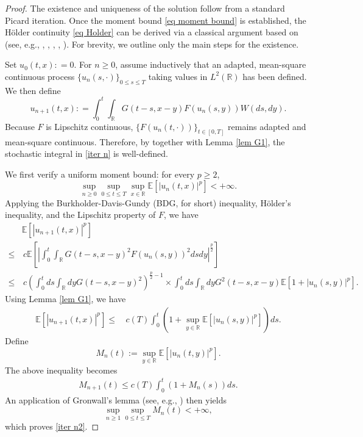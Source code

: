 \documentclass[11pt,reqno]{amsart}
\numberwithin{equation}{section}
\def\R{\mathbb{R}}
\newcommand{\1}{{\bf 1}}
\newcommand{\2}{{\bf 2}}
\begin{document}
 \begin{proof}  The existence and uniqueness of the solution follow from a standard Picard iteration. Once the moment bound \eqref{eq moment bound} is established,   the H\"older continuity  \eqref{eq Holder} can be derived via a  classical argument based on  \cite[Lemmas 2.2, 2.3, 2.4]{CL25} (see, e.g., \cite[Section 5]{D99}, \cite[Theorem 9]{DM03}, \cite[pp. 59--61]{DKMNX09},  \cite[Lemma 4.2.4]{DS26}, \cite{KS23}).     For  brevity, we  outline  only  the main  steps for  the existence.
      
Set  $u_0 (t, x): = 0$. For $n\ge0$,  assume inductively  that    an adapted, mean-square continuous process
  $\{u_n(s, \cdot)\}_{0\le s\le T}$ taking   values in $L^2(\mathbb R)$ has been defined.  We then define   
\begin{equation}\label{iter n}
u_{n+1} (t, x): =   \int_0^t \int_\R G(t-s, x-y) F(u_{n}(s,y)) W(ds, dy). 
\end{equation}
Because $F$  is   Lipschitz continuous,  $\{F(u_{n}(t,\cdot))\}_{t\in [0,T]} $ remains  adapted and mean-square continuous.  Therefore,   by   \cite[Lemma  6 and Theorem 6]{DM03}   together  with  Lemma \ref{lem G1}, the stochastic integral in \eqref{iter n} is well-defined.

 We first verify a uniform moment bound:  for every  $p\ge2$, 
 \begin{equation}\label{iter n2}
 \sup_{n\ge0}\sup_{0\le t\le T}\sup_{x\in\mathbb R}\mathbb E\left[\left|u_{n}(t, x) \right|^p\right]<+\infty. 
 \end{equation}
 Applying  the  Burkholder-Davis-Gundy (BDG, for short) inequality, H\"older's inequality, and the Lipschitz property of $F$, we have
 \begin{align*}
 & \mathbb E\left[\left|u_{n+1}(t, x) \right|^p\right]\\
 \le &\, c\mathbb E\left[\left|\int_0^t   \int_{\mathbb R} G(t-s, x-y)^2 F(u_n(s, y))^2 ds dy\right|^{\frac{p}{2}}  \right]\\
 \le &\,  c \left(\int_0^t ds \int_{\mathbb R} dy G(t-s, x-y)^2 \right)^{\frac{p}{2}-1} \times \int_0^tds\int_{\mathbb R} dy G^2(t-s, x-y)\mathbb E\left[1+\left|u_n(s, y)\right|^p \right].
 \end{align*}
 Using  Lemma \ref{lem G1},  we have 
    \begin{align*}
 \mathbb E\left[\left|u_{n+1}(t, x) \right|^p\right] \le &\, c(T)\int_0^t    \left(1+\sup_{y\in \mathbb R} \mathbb E\left[\left|u_n(s, y)\right|^p\right]\right)ds.
  \end{align*}
Define 
  $$
  M_n(t):=\sup_{y\in \mathbb R}\mathbb E\left[\left|u_n(t, y)\right|^p\right].
  $$
The above inequality becomes 
  \begin{align}\label{eq Grown 3}
  M_{n+1}(t)\le c(T) \int_0^t\left(1+M_n(s)\right)ds. 
  \end{align}
  An application of Gronwall’s lemma (see, e.g., \cite[p. 26]{DKMNX09}) then yields 
  $$
  \sup_{n\ge 1}\sup_{0\le t\le T}M_{n}(t)<+\infty,
  $$
 which proves  \eqref{iter n2}.
  

\end{proof}
\end{document}

